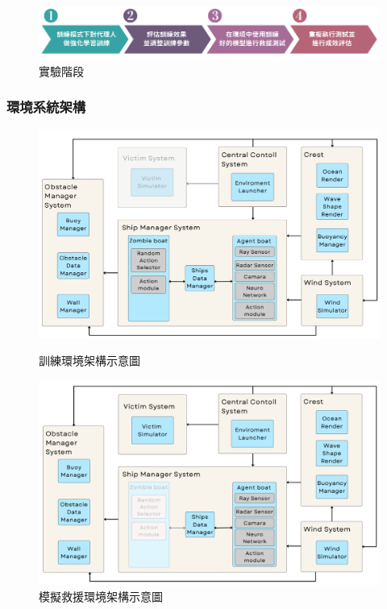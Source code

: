 \documentclass[12pt,a4paper]{article}
\begin{document}
\vspace*{4cm}
\begin{figure}[h]
    \centering
    \begin{minipage}[t]{1\textwidth}
        \centering
        \includegraphics[width=\textwidth]{image/TrainingArch.png}
        \caption{實驗階段}
    \end{minipage}
\end{figure}

\newpage

\subsubsection{環境系統架構}
\begin{figure}[h]
    \centering
    \includegraphics[scale=0.381]{image/TrainingArchitecture.png}
    \caption{訓練環境架構示意圖}
    \label{fig:training_env}

	\vspace*{0.3cm}

    \includegraphics[scale=0.381]{image/SimulationArchitecture.png}
    \caption{模擬救援環境架構示意圖}
    \label{fig:simulation_env}
\end{figure}
\end{document}
